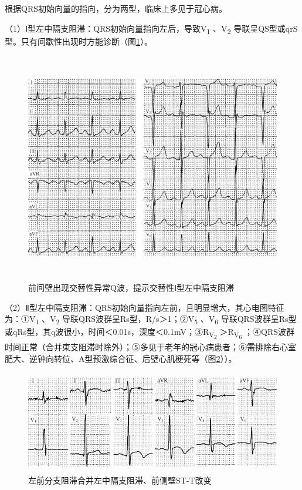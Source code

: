 根据QRS初始向量的指向，分为两型，临床上多见于冠心病。

（1）Ⅰ型左中隔支阻滞：QRS初始向量指向左后，导致V\textsubscript{1}
、V\textsubscript{2}
导联呈QS型或qrS型。只有间歇性出现时方能诊断（图\ref{fig21-9}）。

\begin{figure}[!htbp]
 \centering
 \includegraphics[width=5.58333in,height=3.96875in]{./images/Image00357.jpg}
 \captionsetup{justification=centering}
 \caption{前间壁出现交替性异常Q波，提示交替性Ⅰ型左中隔支阻滞}
 \label{fig21-9}
  \end{figure} 

（2）Ⅱ型左中隔支阻滞：QRS初始向量指向左前，且明显增大，其心电图特征为：①V\textsubscript{1}
、V\textsubscript{2} 导联QRS波群呈Rs型，R/s＞1；②V\textsubscript{5}
、V\textsubscript{6}
导联QRS波群呈Rs型或qRs型，其q波很小，时间＜0.01s，深度＜0.1mV；③R\textsubscript{V\textsubscript{2}}
＞R\textsubscript{V\textsubscript{6}}
；④QRS波群时间正常（合并束支阻滞时除外）；⑤多见于老年的冠心病患者；⑥需排除右心室肥大、逆钟向转位、A型预激综合征、后壁心肌梗死等（图\ref{fig21-10}））。

\begin{figure}[!htbp]
 \centering
 \includegraphics[width=4.89583in,height=1.76042in]{./images/Image00358.jpg}
 \captionsetup{justification=centering}
 \caption{左前分支阻滞合并左中隔支阻滞、前侧壁ST-T改变}
 \label{fig21-10}
  \end{figure} 

